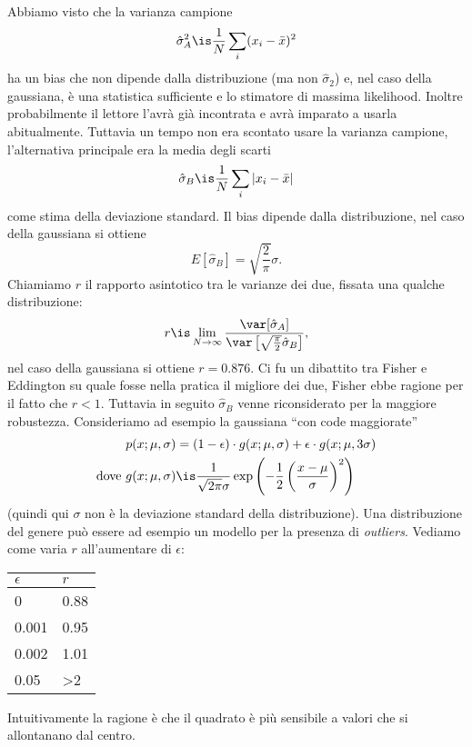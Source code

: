 \begin{example}
	Abbiamo visto che la varianza campione
	\begin{equation*}
		\hat\sigma^2_A \is \frac1N \sum_i (x_i-\bar x)^2
	\end{equation*}
	ha un bias che non dipende dalla distribuzione (ma non $\hat\sigma_2$) e,
	nel caso della gaussiana,
	è una statistica sufficiente e lo stimatore di massima likelihood.
	Inoltre probabilmente il lettore l'avrà già incontrata e avrà imparato a usarla abitualmente.
	Tuttavia un tempo non era scontato usare la varianza campione,
	l'alternativa principale era la media degli scarti
	\begin{equation*}
		\hat\sigma_B \is \frac1N \sum_i |x_i - \bar x|
	\end{equation*}
	come stima della deviazione standard.
	Il bias dipende dalla distribuzione, nel caso della gaussiana si ottiene
	\begin{equation*}
		E[\hat\sigma_B] = \sqrt{\frac2\pi} \sigma.
	\end{equation*}
	Chiamiamo $r$ il rapporto asintotico tra le varianze dei due, fissata una qualche distribuzione:
	\begin{equation*}
		r \is \lim_{N\to\infty} \frac {\var[\hat\sigma_A]} {\var\left[\sqrt{\frac\pi2}\hat\sigma_B\right]},
	\end{equation*}
	nel caso della gaussiana si ottiene $r=0.876$.
	Ci fu un dibattito tra Fisher e Eddington su quale fosse nella pratica il migliore dei due,
	Fisher ebbe ragione per il fatto che $r<1$.
	Tuttavia in seguito $\hat\sigma_B$ venne riconsiderato per la maggiore robustezza.
	Consideriamo ad esempio la gaussiana ``con code maggiorate''
	\begin{align*}
		p(x;\mu,\sigma)
		&= (1-\epsilon)\cdot g(x;\mu,\sigma) + \epsilon\cdot g(x;\mu,3\sigma) \\
		\text{dove }g(x;\mu,\sigma)
		&\is \frac1{\sqrt{2\pi}\sigma} \exp \left(-\frac12\left(\frac{x-\mu}\sigma\right)^2\right)
	\end{align*}
	(quindi qui $\sigma$ non è la deviazione standard della distribuzione).
	Una distribuzione del genere può essere ad esempio un modello per la presenza di \emph{outliers}.
	Vediamo come varia $r$ all'aumentare di $\epsilon$:
	\begin{center}
		\begin{tabular}{ll}
			$\epsilon$ & $r$ \\
			\hline
			0     & 0.88 \\
			0.001 & 0.95 \\
			0.002 & 1.01 \\
			0.05  & >2   \\
		\end{tabular}
	\end{center}
	Intuitivamente la ragione è che il quadrato è più sensibile a valori che si allontanano dal centro.
\end{example}

